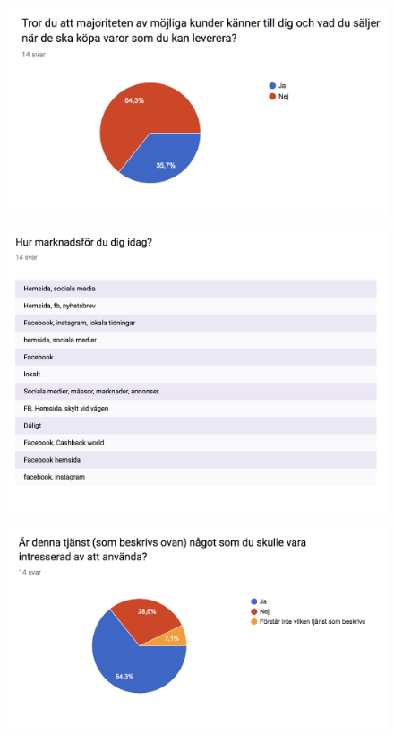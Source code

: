 \documentclass[10pt,a4paper,oneside]{article}
\begin{document}
\begin{figure}
	\includegraphics[scale=0.6]{7.png}
\end{figure}

\begin{figure}
	\includegraphics[scale=0.6]{8.png}
\end{figure}

\begin{figure}
	\includegraphics[scale=0.6]{9.png}
\end{figure}
\end{document}
